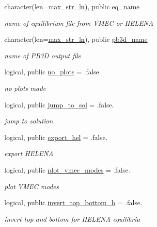 \begin{DoxyCompactItemize}
character(len=\hyperlink{namespacenum__vars_a3ff2bb983ee80a6735277d6789e6ce7c}{max\+\_\+str\+\_\+ln}), public \hyperlink{namespacenum__vars_a3cc0fc4b1538f7203be1604cb4f7c9bc}{eq\+\_\+name}
\begin{DoxyCompactList}\small\item\em name of equilibrium file from V\+M\+EC or H\+E\+L\+E\+NA \end{DoxyCompactList}\item 
character(len=\hyperlink{namespacenum__vars_a3ff2bb983ee80a6735277d6789e6ce7c}{max\+\_\+str\+\_\+ln}), public \hyperlink{namespacenum__vars_a8b3ab3b12cddc0c3e60c3430912b5f3c}{pb3d\+\_\+name}
\begin{DoxyCompactList}\small\item\em name of P\+B3D output file \end{DoxyCompactList}\item 
logical, public \hyperlink{namespacenum__vars_afe223f0c9580de8bf52d2cedc2ab2ee8}{no\+\_\+plots} = .false.
\begin{DoxyCompactList}\small\item\em no plots made \end{DoxyCompactList}\item 
logical, public \hyperlink{namespacenum__vars_acd9fb4b84728c986d5ecde709dcac940}{jump\+\_\+to\+\_\+sol} = .false.
\begin{DoxyCompactList}\small\item\em jump to solution \end{DoxyCompactList}\item 
logical, public \hyperlink{namespacenum__vars_aa1342b6b43268bd10bb254fa9bf754f0}{export\+\_\+hel} = .false.
\begin{DoxyCompactList}\small\item\em export H\+E\+L\+E\+NA \end{DoxyCompactList}\item 
logical, public \hyperlink{namespacenum__vars_a89067eb4dc3fcdcc85d7cf185d3774ea}{plot\+\_\+vmec\+\_\+modes} = .false.
\begin{DoxyCompactList}\small\item\em plot V\+M\+EC modes \end{DoxyCompactList}\item 
logical, public \hyperlink{namespacenum__vars_a9c579c39602d4a4761335866603aea5f}{invert\+\_\+top\+\_\+bottom\+\_\+h} = .false.
\begin{DoxyCompactList}\small\item\em invert top and bottom for H\+E\+L\+E\+NA equilibria \end{DoxyCompactList}\item 

\end{DoxyCompactItemize}
